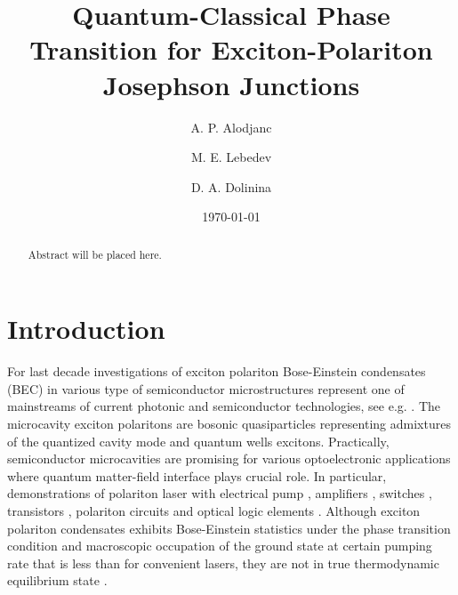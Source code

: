 \documentclass[aps, pre, preprint, groupedaddress, superscriptaddress, showkeys, showpacs] {revtex4-1}
\begin{document}
\title{Quantum-Classical Phase Transition for Exciton-Polariton Josephson Junctions}

\author{A. P. Alodjanc}

\author{M. E. Lebedev}

\author{D. A. Dolinina}

\date{\today}

\begin{abstract}
Abstract will be placed here.
\end{abstract}

\pacs{\dots}
\keywords{\dots}

\maketitle

\newcommand{\sn}{\textrm{sn}}
\newcommand{\cn}{\textrm{cn}}
\newcommand{\dn}{\textrm{dn}}
\newcommand{\sd}{\textrm{sd}}
\newcommand{\cd}{\textrm{cd}}
\newcommand{\nd}{\textrm{nd}}
\newcommand{\am}{\textrm{am}}

\newcommand{\red}{\color{red}}

\section{Introduction \label{sec:introduction}}

For last decade investigations of exciton polariton Bose-Einstein condensates (BEC) in various type of semiconductor microstructures represent one of mainstreams of current photonic and semiconductor technologies, see e.g. \cite{Sanvitto,Guillet}.
The microcavity exciton polaritons are bosonic quasiparticles representing  admixtures of the quantized cavity mode and quantum wells excitons.
Practically, semiconductor microcavities are promising for various optoelectronic applications where quantum  matter-field interface plays crucial role.
In particular, demonstrations of polariton laser with electrical pump \cite{Bhattacharya,Schneider}, amplifiers \cite{Niemietz}, switches \cite{Amo_2010}, transistors \cite{Ballarini}, polariton circuits and optical logic elements \cite{Sturm,Liew}.
Although exciton polariton condensates exhibits Bose-Einstein statistics under the phase transition condition and macroscopic occupation of the ground state at certain pumping rate that is less than for convenient lasers, they are not in true thermodynamic equilibrium state \cite{Byrnes_2014,Sun}.
  
\end{document}
